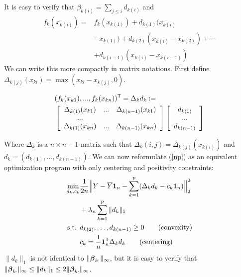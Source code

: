 It is easy to verify that $\beta_{k(i)} = \sum_{j \leq i} d_{k(i)}$ and 
\begin{equation}
\begin{split}
f_k(x_{k(i)}) = & f_k({x_{k(1)}}) +d_{k(1)} ( x_{k(i)} \\
& - x_{k(1)}) + d_{k(2)} ( x_{k(i)} - x_{k(2)}) + \cdots  \\
& + d_{k(i-1)} ( x_{k(i)} - x_{k(i-1)})
\end{split}
\end{equation}
We can write this more compactly in matrix notations. First define $\Delta_{k(j)}(x_{ki}) = \max( x_{ki} - x_{k(j)}, 0)$. 


\begin{equation*}
\begin{split}
&(f_k(x_{k1}) ,..., f_k(x_{kn}))^\tran = \Delta_k d_k \coloneqq \\
\vspace{0.1in}
&\left[ \begin{array}{ccc}
    \Delta_{k(1)}(x_{k1}) & ... & \Delta_{k(n-1)}(x_{k1}) \\
    ... & & \\
    \Delta_{k(1)}(x_{kn}) & ... & \Delta_{k(n-1)}(x_{kn}) 
\end{array} \right]
\left[ \begin{array}{c}
    d_{k(1)} \\
    ... \\
    d_{k(n-1)}
\end{array} \right] 
\end{split}
\end{equation*}

Where $\Delta_k$ is a $n\times n-1$ matrix such that $\Delta_k(i,j) = \Delta_{k(j)}(x_{k(i)})$ and $d_k = (d_{k(1)} ,..., d_{k(n-1)})$. We can now reformulate (\ref{np}) as an equivalent optimization program with only centering and positivity constraints:
\begin{align}
\min_{d_k, c_k}& \frac{1}{2n} 
       \Bigl\| Y - \overline{Y}\mbox{\boldmath $1$}_n - \sum_{k=1}^p 
             ( \Delta_k d_k - c_k \mbox{\boldmath $1$}_n) \Bigr\|_2^2 \nonumber \\
               & + \lambda_n \sum_{k=1}^p \|d_k\|_1   \label{opt:alternate_opt} \\
\textrm{s.t. }  & d_{k(2)}, \ldots , d_{k(n-1)} \geq 0  	
               \qquad \textrm{(convexity)} \nonumber \\ 
	& c_k = \frac{1}{n} \mbox{\boldmath $1$}_n^{\mathsf{T}} \Delta_k d_k 	
               \qquad \textrm{(centering)} \nonumber 
\end{align}
$\|d_k\|_1$ is not identical to $\|\boldsymbol{\beta}_{k\cdot}\|_{\infty}$, but it is easy to verify that $\|\boldsymbol{\beta}_{k\cdot}\|_{\infty} \leq \|d_k\|_1 \leq 2\|\boldsymbol{\beta}_{k\cdot}\|_{\infty}$.

